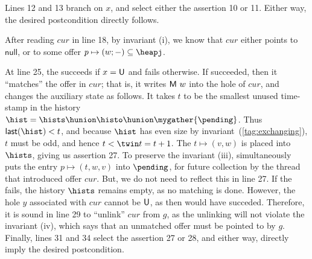 Lines 12 and 13 branch on $x$, and select either the assertion 10 or
11. Either way, the desired postcondition directly follows.


After reading $cur$ in line 18, by invariant (i), we know that $cur$
either points to $\mathsf{null}$, or to some offer $p \mapsto (w; -)
\subseteq \heapj$.


At line 25, the  succeeds if $x = {\mathsf{U}}$ and fails
otherwise. If  succeeded, then it ``matches'' the offer in $cur$;
that is, it writes ${\mathsf{M}\ w}$ into the hole of $cur$, and changes the
auxiliary state as follows. It takes $t$ to be the smallest unused
time-stamp in the history $\hist = \hists \hunion \histo \hunion
\mygather{\pending}$. Thus $\mathsf{last}(\hist) < t$, and because
$\hist$ has even size by invariant~(\ref{tag:exchanging}), $t$ must be
odd, and hence $t < \twin t = t+1$. The $t \mapsto (v, w)$ is placed
into $\hists$, giving us assertion 27.  To preserve the invariant
(iii),  simultaneously puts the entry $p \mapsto (t, w, v)$ into
$\pending$, for future collection by the thread that introduced offer
$cur$. But, we do not need to reflect this in line 27.
%
If the  fails, the history $\hists$ remains empty, as no matching is
done. However, the hole $y$ associated with $cur$ cannot be
${\mathsf{U}}$, as then  would have succeded.
%
Therefore, it is sound in line 29 to ``unlink'' $cur$ from $g$, as the
unlinking will not violate the invariant (iv), which says that an
unmatched offer must be pointed to by $g$.
%
Finally, lines 31 and 34 select the assertion 27 or 28, and either
way, directly imply the desired postcondition.



